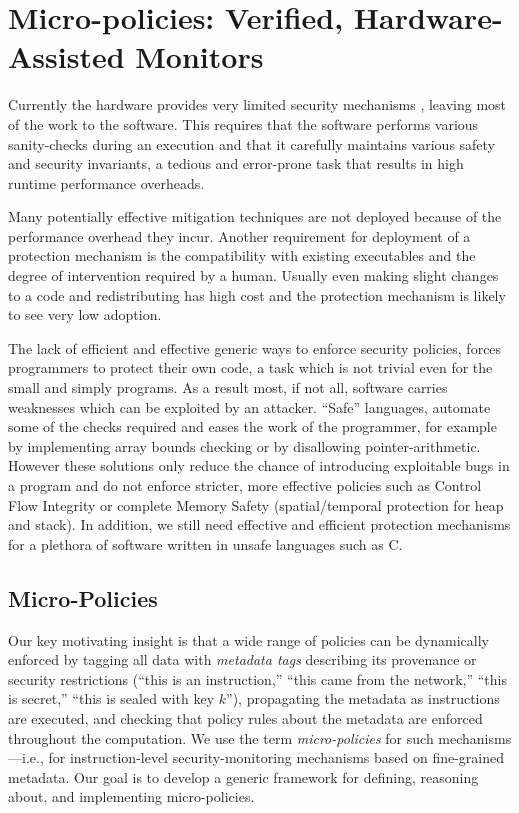 \chapter{Micro-policies: Verified, Hardware-Assisted Monitors}\label{ch:policies}
Currently the hardware provides very limited security mechanisms , 
leaving most of the work to the software. This requires that the software 
performs various sanity-checks during an execution and that it carefully 
maintains various safety and security invariants, a tedious and error-prone task
that results in high runtime performance overheads.  

Many potentially effective mitigation techniques are not deployed because of the
performance overhead they incur. Another requirement for deployment of a 
protection mechanism is the compatibility with existing executables and 
the degree of intervention required by a human. 
Usually even making slight changes to a code and redistributing has high cost
and the protection mechanism is likely to see very low adoption. 

The lack of efficient and effective generic ways to enforce security policies, 
forces programmers to protect their own code, a task which is not trivial even 
for the small and simply programs. As a result most, if not all, software 
carries weaknesses which can be exploited by an attacker. ``Safe'' languages, 
automate some of the checks required and eases the work of the programmer,
for example by implementing array bounds checking or by disallowing 
pointer-arithmetic. However these solutions only reduce the chance of 
introducing exploitable bugs in a program and do not enforce stricter, 
more effective policies such as Control Flow Integrity
or complete Memory Safety (spatial/temporal protection for heap and stack). 
In addition, we still need effective and efficient protection mechanisms for a 
plethora of software written in unsafe languages such as C.

\section{Micro-Policies}


Our key motivating insight is that a wide range of policies can
be dynamically enforced by tagging all data with {\em metadata tags}
describing its
provenance or security restrictions (\EG ``this is an instruction,'' ``this
came from the network,'' ``this is secret,'' ``this is sealed with key
$k$''), propagating the metadata as instructions are executed, and checking
that policy rules about the metadata are enforced throughout the
computation.  We use the term {\em micro-policies} for such
mechanisms---i.e., for instruction-level security-monitoring mechanisms
based on fine-grained metadata.  Our goal is to develop a generic framework
for defining, reasoning about, and implementing micro-policies.

